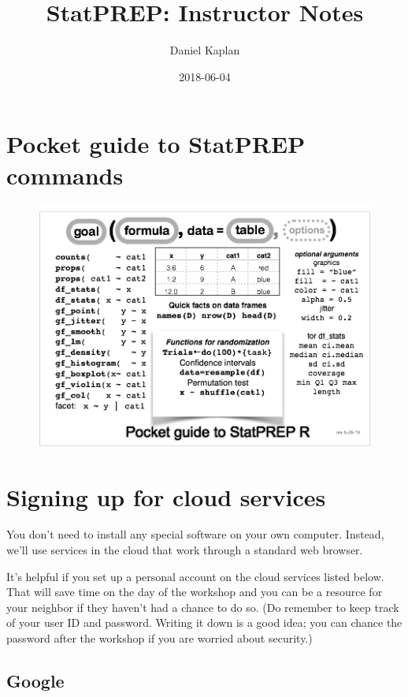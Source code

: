 \documentclass[]{book}
\title{StatPREP: Instructor Notes}
\author{Daniel Kaplan}
\date{2018-06-04}
\theoremstyle{definition}
\theoremstyle{definition}
\theoremstyle{definition}
\theoremstyle{remark}
\begin{document}
\maketitle

{
\setcounter{tocdepth}{1}
\tableofcontents
}
\chapter{Pocket guide to StatPREP
commands}\label{pocket-guide-to-statprep-commands}

\begin{figure}
\centering
\includegraphics{images/essential_statprep_commands.png}
\caption{}
\end{figure}

\chapter{Signing up for cloud
services}\label{signing-up-for-cloud-services}

You don't need to install any special software on your own computer.
Instead, we'll use services in the cloud that work through a standard
web browser.

It's helpful if you set up a personal account on the cloud services
listed below. That will save time on the day of the workshop and you can
be a resource for your neighbor if they haven't had a chance to do so.
(Do remember to keep track of your user ID and password. Writing it down
is a good idea; you can chance the password after the workshop if you
are worried about security.)

\section{Google}\label{google}
\end{document}
